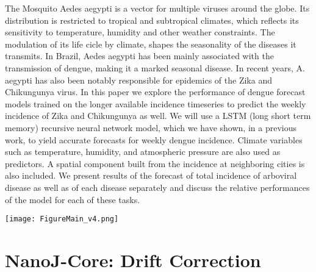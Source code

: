 \documentclass[a0,portrait]{a0poster}
\begin{document}
\begin{multicols}{3} %


\noindent
The Mosquito Aedes aegypti is a vector for multiple viruses around the globe. Its distribution is restricted to tropical and subtropical climates, which reflects its sensitivity to temperature, humidity and other weather constraints. The modulation of its life cicle by climate, shapes the seasonality of the diseases it transmits.
 In Brazil, Aedes aegypti has been mainly associated with the transmission of dengue, making it a marked seasonal disease. In recent years, A. aegypti has also been notably responsible for epidemics of the Zika and Chikungunya virus. In this paper we explore the performance of dengue forecast models trained on the longer available incidence timeseries to predict the weekly incidence of Zika and Chikungunya as well.  We will use a LSTM (long short term memory) recursive neural network model, which we have shown, in a previous work, to yield accurate forecasts for weekly dengue incidence. Climate variables such as temperature, humidity, and atmospheric pressure are also used as predictors. A spatial component built from the incidence at neighboring cities is also included. We present results of the forecast of total incidence of arboviral disease as well as of each disease separately and discuss the relative performances of the model for each of these tasks.



\begin{center}\vspace{1cm}
\texttt{[image: FigureMain\_v4.png]}
\end{center}%

\section*{NanoJ-Core: Drift Correction}


\end{multicols}
\end{document}
